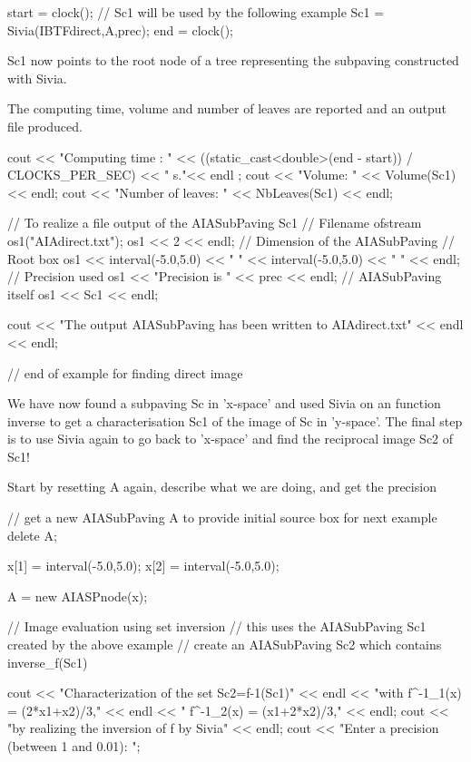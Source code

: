 \begin{DoxyCodeInclude}
  start = clock();
                    // Sc1 will be used by the following example
  Sc1 = Sivia(IBTFdirect,A,prec);
  end = clock();

\end{DoxyCodeInclude}


\-Sc1 now points to the root node of a tree representing the subpaving constructed with \-Sivia.

\-The computing time, volume and number of leaves are reported and an output file produced.


\begin{DoxyCodeInclude}
  cout << "Computing time : " 
       << ((static_cast<double>(end - start)) / CLOCKS_PER_SEC) << " s."<< endl
      ;
  cout << "Volume: " << Volume(Sc1) << endl;
  cout << "Number of leaves: " << NbLeaves(Sc1) << endl;

  // To realize a file output of the AIASubPaving Sc1
                    // Filename
  ofstream os1("AIAdirect.txt");
  os1 << 2 << endl; // Dimension of the AIASubPaving
                    // Root box
  os1 << interval(-5.0,5.0) << " "
    << interval(-5.0,5.0) << " " << endl;
                    // Precision used
  os1 << "Precision is " << prec << endl;
                    // AIASubPaving itself
  os1 << Sc1 << endl;

  cout << "The output AIASubPaving has been written to AIAdirect.txt" 
       << endl << endl;

  // end of example for finding direct image

\end{DoxyCodeInclude}


\-We have now found a subpaving \-Sc in 'x-\/space' and used \-Sivia on an function inverse to get a characterisation \-Sc1 of the image of \-Sc in 'y-\/space'. \-The final step is to use \-Sivia again to go back to 'x-\/space' and find the reciprocal image \-Sc2 of \-Sc1!

\-Start by resetting \-A again, describe what we are doing, and get the precision


\begin{DoxyCodeInclude}
  // get a new AIASubPaving A to provide initial source box for next example
  delete A;

  x[1] = interval(-5.0,5.0);
  x[2] = interval(-5.0,5.0);

  A = new AIASPnode(x);

  // Image evaluation using set inversion
  // this uses the AIASubPaving Sc1 created by the above example
  // create an AIASubPaving Sc2 which contains inverse_f(Sc1)

  cout << "Characterization of the set Sc2=f-1(Sc1)" << endl
    << "with f^-1_1(x) = (2*x1+x2)/3," << endl
    << "     f^-1_2(x) = (x1+2*x2)/3," << endl;
  cout << "by realizing the inversion of f by Sivia" << endl;
  cout << "Enter a precision (between 1 and 0.01): ";

\end{DoxyCodeInclude}


